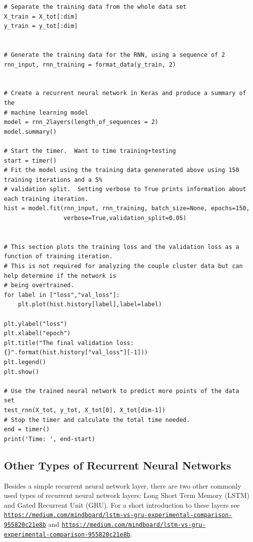 \documentclass[%
oneside,                 %
final,                   %
10pt]{article}
\begin{document}
\begin{verbatim}
# Separate the training data from the whole data set
X_train = X_tot[:dim]
y_train = y_tot[:dim]


# Generate the training data for the RNN, using a sequence of 2
rnn_input, rnn_training = format_data(y_train, 2)


# Create a recurrent neural network in Keras and produce a summary of the 
# machine learning model
model = rnn_2layers(length_of_sequences = 2)
model.summary()

# Start the timer.  Want to time training+testing
start = timer()
# Fit the model using the training data genenerated above using 150 training iterations and a 5%
# validation split.  Setting verbose to True prints information about each training iteration.
hist = model.fit(rnn_input, rnn_training, batch_size=None, epochs=150, 
                 verbose=True,validation_split=0.05)


# This section plots the training loss and the validation loss as a function of training iteration.
# This is not required for analyzing the couple cluster data but can help determine if the network is
# being overtrained.
for label in ["loss","val_loss"]:
    plt.plot(hist.history[label],label=label)

plt.ylabel("loss")
plt.xlabel("epoch")
plt.title("The final validation loss: {}".format(hist.history["val_loss"][-1]))
plt.legend()
plt.show()

# Use the trained neural network to predict more points of the data set
test_rnn(X_tot, y_tot, X_tot[0], X_tot[dim-1])
# Stop the timer and calculate the total time needed.
end = timer()
print('Time: ', end-start)

\end{verbatim}


\subsection*{Other Types of Recurrent Neural Networks}

Besides a simple recurrent neural network layer, there are two other
commonly used types of recurrent neural network layers: Long Short
Term Memory (LSTM) and Gated Recurrent Unit (GRU).  For a short
introduction to these layers see \href{{https://medium.com/mindboard/lstm-vs-gru-experimental-comparison-955820c21e8b}}{\nolinkurl{https://medium.com/mindboard/lstm-vs-gru-experimental-comparison-955820c21e8b}}
and \href{{https://medium.com/mindboard/lstm-vs-gru-experimental-comparison-955820c21e8b}}{\nolinkurl{https://medium.com/mindboard/lstm-vs-gru-experimental-comparison-955820c21e8b}}.
\end{document}
